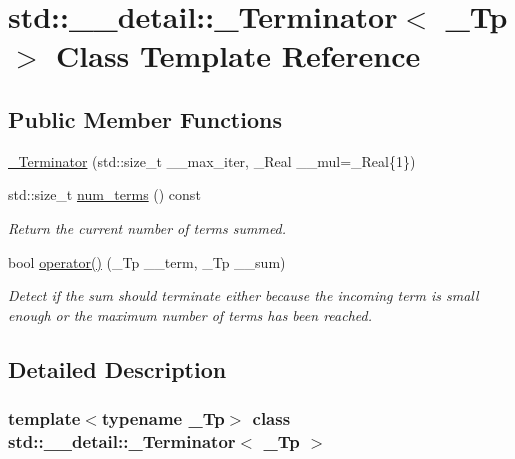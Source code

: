 \hypertarget{classstd_1_1____detail_1_1__Terminator}{}\section{std\+:\+:\+\_\+\+\_\+detail\+:\+:\+\_\+\+Terminator$<$ \+\_\+\+Tp $>$ Class Template Reference}
\label{classstd_1_1____detail_1_1__Terminator}
\subsection*{Public Member Functions}
\begin{DoxyCompactItemize}
\item 
\hyperlink{classstd_1_1____detail_1_1__Terminator_aee41e518162f472b6e62a5477f3256d4}{\+\_\+\+Terminator} (std\+::size\+\_\+t \+\_\+\+\_\+max\+\_\+iter, \+\_\+\+Real \+\_\+\+\_\+mul=\+\_\+\+Real\{1\})
\item 
std\+::size\+\_\+t \hyperlink{classstd_1_1____detail_1_1__Terminator_a8797a4fa304ad360f9b101bd340d614d}{num\+\_\+terms} () const
\begin{DoxyCompactList}\small\item\em Return the current number of terms summed. \end{DoxyCompactList}\item 
bool \hyperlink{classstd_1_1____detail_1_1__Terminator_a6c69c623075f36692ae86dd65b9c4a5c}{operator()} (\+\_\+\+Tp \+\_\+\+\_\+term, \+\_\+\+Tp \+\_\+\+\_\+sum)
\begin{DoxyCompactList}\small\item\em Detect if the sum should terminate either because the incoming term is small enough or the maximum number of terms has been reached. \end{DoxyCompactList}\end{DoxyCompactItemize}


\subsection{Detailed Description}
\subsubsection*{template$<$typename \+\_\+\+Tp$>$\newline
class std\+::\+\_\+\+\_\+detail\+::\+\_\+\+Terminator$<$ \+\_\+\+Tp $>$}

